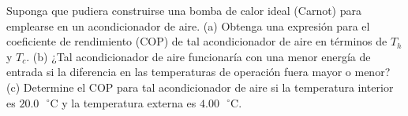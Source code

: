 \item Suponga que pudiera construirse una bomba de calor ideal (Carnot) para emplearse en un acondicionador de aire. (a) Obtenga una expresión para el coeficiente de rendimiento (COP) de tal acondicionador de aire en términos de $T_h$ y $T_c$. (b) ¿Tal acondicionador de aire funcionaría con una menor energía de entrada si la diferencia en las temperaturas de operación fuera mayor o menor? (c) Determine el COP para tal acondicionador de aire si la temperatura interior es $20.0\text{ }^\circ\text{C}$ y la temperatura externa es $4.00\text{ }^\circ\text{C}$.
